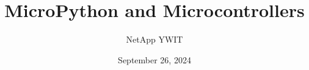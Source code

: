 \documentclass{report}
\begin{document}
\title{MicroPython and Microcontrollers}
\author{NetApp YWIT}
\date{September 26, 2024}
\maketitle

\tableofcontents











\appendix


\end{document}
